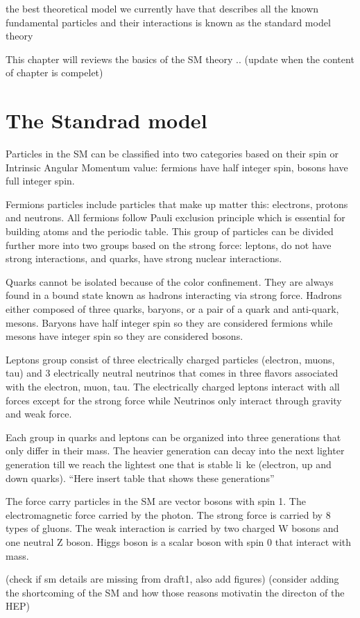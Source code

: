 
the best theoretical model we currently have that describes all the known fundamental particles and their interactions is known as the standard model theory 

This chapter will reviews the basics of the SM theory .. (update when the content of chapter is compelet)

\section{The Standrad model}

Particles in the SM can be classified into two categories based on their spin or Intrinsic Angular Momentum value: fermions have half integer spin, bosons have full integer spin.

Fermions particles include particles that make up matter this: electrons, protons and neutrons. All fermions follow Pauli exclusion principle which is essential for building atoms and the periodic table. This group of particles can be divided further more into two groups based on the strong force: leptons, do not have strong interactions, and quarks, have strong nuclear interactions.

Quarks cannot be isolated because of the color confinement. They are always found in a bound state known as hadrons interacting via strong force. Hadrons either composed of three quarks, baryons, or a pair of a quark and anti-quark, mesons. Baryons have half integer spin so they are considered fermions while mesons have integer spin so they are considered bosons.

Leptons group consist of three electrically charged particles (electron, muons, tau) and 3 electrically neutral neutrinos that comes in three flavors associated with the electron, muon, tau. The electrically charged leptons interact with all forces except for the strong force while Neutrinos only interact through gravity and weak force.

Each group in quarks  and leptons can be organized into three generations that only differ in their mass. The heavier generation can decay into the next lighter generation till we reach the lightest one that is stable li\
ke (electron, up and  down quarks). “Here insert table that shows these generations”

The force carry particles in the SM are vector bosons with spin 1. The electromagnetic force carried by the photon. The strong force is carried by 8 types of gluons. The weak interaction is carried by two charged W bosons and one neutral Z boson. Higgs boson is a scalar boson with spin 0 that interact with mass.

(check if sm details are missing from draft1, also add figures)
(consider adding the shortcoming of the SM and how those reasons motivatin the directon of the HEP) 
